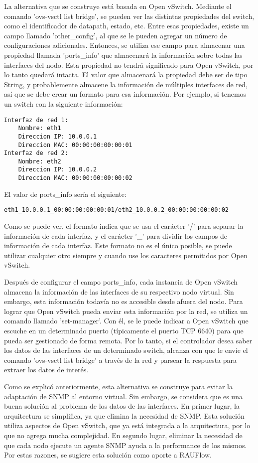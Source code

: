 La alternativa que se construye está basada en Open vSwitch. Mediante el comando 'ovs-vsctl list bridge', se pueden ver las distintas propiedades del switch, como el identificador de datapath, estado, etc. Entre esas propiedades, existe un campo llamado 'other\_config', al que se le pueden agregar un número de configuraciones adicionales. Entonces, se utiliza ese campo para almacenar una propiedad llamada 'ports\_info' que almacenará la información sobre todas las interfaces del nodo. Esta propiedad no tendrá significado para Open vSwitch, por lo tanto quedará intacta. El valor que almacenará la propiedad debe ser de tipo String, y probablemente almacene la información de múltiples interfaces de red, así que se debe crear un formato para esa información. Por ejemplo, si tenemos un switch con la siguiente información:
\begin{lstlisting}
Interfaz de red 1:
	Nombre: eth1
	Direccion IP: 10.0.0.1
	Direccion MAC: 00:00:00:00:00:01
Interfaz de red 2:
	Nombre: eth2
	Direccion IP: 10.0.0.2
	Direccion MAC: 00:00:00:00:00:02
\end{lstlisting}
El valor de ports\_info sería el siguiente:
\begin{lstlisting}
eth1_10.0.0.1_00:00:00:00:00:01/eth2_10.0.0.2_00:00:00:00:00:02
\end{lstlisting}

Como se puede ver, el formato indica que se usa el carácter '/' para separar la información de cada interfaz, y el carácter '\_' para dividir los campos de información de cada interfaz. Este formato no es el único posible, se puede utilizar cualquier otro siempre y cuando use los caracteres permitidos por Open vSwitch.

Después de configurar el campo ports\_info, cada instancia de Open vSwitch almacena la información de las interfaces de su respectivo nodo virtual. Sin embargo, esta información todavía no es accesible desde afuera del nodo. Para lograr que Open vSwitch pueda enviar esta información por la red, se utiliza un comando llamado 'set-manager'. Con él, se le puede indicar a Open vSwitch que escuche en un determinado puerto (típicamente el puerto TCP 6640) para que pueda ser gestionado de forma remota. Por lo tanto, si el controlador desea saber los datos de las interfaces de un determinado switch, alcanza con que le envíe el comando 'ovs-vsctl list bridge' a través de la red y parsear la respuesta para extraer los datos de interés.

Como se explicó anteriormente, esta alternativa se construye para evitar la adaptación de SNMP al entorno virtual. Sin embargo, se considera que es una buena solución al problema de los datos de las interfaces. En primer lugar, la arquitectura se simplifica, ya que elimina la necesidad de SNMP. Esta solución utiliza aspectos de Open vSwitch, que ya está integrada a la arquitectura, por lo que no agrega mucha complejidad. En segundo lugar, eliminar la necesidad de que cada nodo ejecute un agente SNMP ayuda a la performance de los mismos. Por estas razones, se sugiere esta solución como aporte a RAUFlow.

